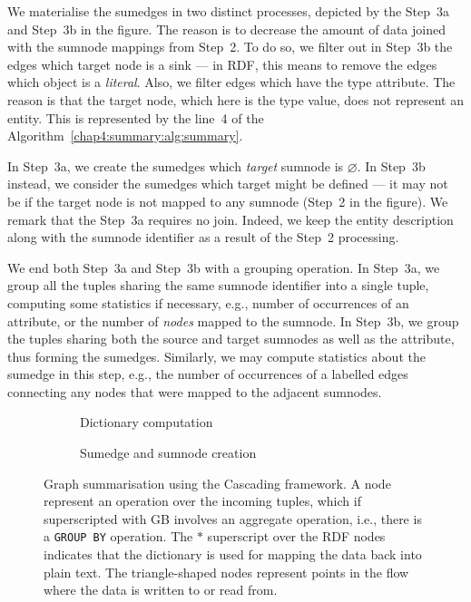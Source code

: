 \label{chap4:summary:algo:edge-materialisation}

We materialise the sumedges in two distinct processes, depicted by the Step~3a and Step~3b in the figure. The reason is to decrease the amount of data joined with the sumnode mappings from Step~2. To do so, we filter out in Step~3b the edges which target node is a sink --- in RDF, this means to remove the edges which object is a \emph{literal}. Also, we filter edges which have the type attribute. The reason is that the target node, which here is the type value, does not represent an entity. This is represented by the line~4 of the Algorithm~\ref{chap4:summary:alg:summary}.

In Step~3a, we create the sumedges which \emph{target} sumnode is $\varnothing$. In Step~3b instead, we consider the sumedges which target might be defined --- it may not be if the target node is not mapped to any sumnode (Step~2 in the figure). We remark that the Step~3a requires no join. Indeed, we keep the entity description along with the sumnode identifier as a result of the Step~2 processing.


We end both Step~3a and Step~3b with a grouping operation. In Step~3a, we group all the tuples sharing the same sumnode identifier into a single tuple, computing some statistics if necessary, e.g., number of occurrences of an attribute, or the number of \emph{nodes} mapped to the sumnode. In Step~3b, we group the tuples sharing both the source and target sumnodes as well as the attribute, thus forming the sumedges. Similarly, we may compute statistics about the sumedge in this step, e.g., the number of occurrences of a labelled edges connecting any nodes that were mapped to the adjacent sumnodes.

\begin{figure}
	\centering
	\begin{subfigure}{\textwidth}
		\centering
		\resizebox{.6\textwidth}{!}{
			
		}
		\caption{Dictionary computation}
		\label{chap4:summary:fig:dict-cascading}
	\end{subfigure}
	\qquad
	\begin{subfigure}{\textwidth}
		\centering
		\resizebox{\textwidth}{!}{
			
		}
		\caption{Sumedge and sumnode creation}
		\label{fig:va-cascading}
	\end{subfigure}
	\caption[Graph summarisation using the Cascading framework]{Graph summarisation using the Cascading framework. A node represent an operation over the incoming tuples, which if superscripted with GB involves an aggregate operation, i.e., there is a \texttt{GROUP BY} operation. The $*$ superscript over the RDF nodes indicates that the dictionary is used for mapping the data back into plain text. The triangle-shaped nodes represent points in the flow where the data is written to or read from.}
	\label{chap4:summary:fig:summary-cascading}
\end{figure}

